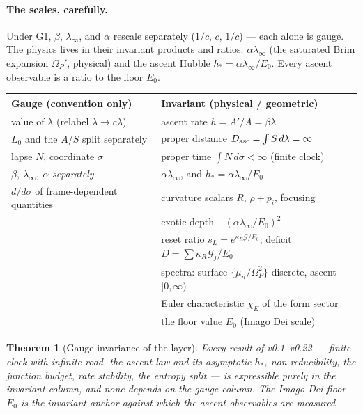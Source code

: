 \documentclass[11pt,a4paper]{article}
\theoremstyle{plain}
\newtheorem{theorem}{Theorem}
\theoremstyle{definition}
\theoremstyle{remark}
\begin{document}
\paragraph{The scales, carefully.} Under G1, $\beta$, $\lambda_\infty$, and $\alpha$ rescale separately
($1/c$, $c$, $1/c$) --- each alone is gauge. The physics lives in their invariant products and ratios:
$\alpha\lambda_\infty$ (the saturated Brim expansion $\Omega_P'$, physical) and the ascent Hubble
$h_*=\alpha\lambda_\infty/E_0$. Every ascent observable is a ratio to the floor $E_0$.

\begin{center}
\renewcommand{\arraystretch}{1.3}
\begin{tabular}{ll}
\hline
\textbf{Gauge (convention only)} & \textbf{Invariant (physical / geometric)}\\
\hline
value of $\lambda$ (relabel $\lambda\to c\lambda$) & ascent rate $h=A'/A=\beta\lambda$\\
$L_0$ and the $A$/$S$ split separately & proper distance $D_{\rm asc}=\int S\,d\lambda=\infty$\\
lapse $N$, coordinate $\sigma$ & proper time $\int N\,d\sigma<\infty$ (finite clock)\\
$\beta,\ \lambda_\infty,\ \alpha$ \emph{separately} & $\alpha\lambda_\infty$, and $h_*=\alpha\lambda_\infty/E_0$\\
$d/d\sigma$ of frame-dependent quantities & curvature scalars $R$, $\rho+p_i$, focusing\\
& exotic depth $-(\alpha\lambda_\infty/E_0)^2$\\
& reset ratio $s_L=e^{\kappa_R\mathcal G/E_0}$; deficit $D=\sum\kappa_R\mathcal G_j/E_0$\\
& spectra: surface $\{\mu_n/\Omega_P^2\}$ discrete, ascent $[0,\infty)$\\
& Euler characteristic $\chi_E$ of the form sector\\
& the floor value $E_0$ (Imago Dei scale)\\
\hline
\end{tabular}
\end{center}

\begin{theorem}[Gauge-invariance of the layer]
Every result of v0.1--v0.22 --- finite clock with infinite road, the ascent law and its asymptotic
$h_*$, non-reducibility, the junction budget, rate stability, the entropy split --- is expressible
purely in the invariant column, and none depends on the gauge column. The Imago Dei floor $E_0$ is the
invariant anchor against which the ascent observables are measured.
\end{theorem}
\end{document}
